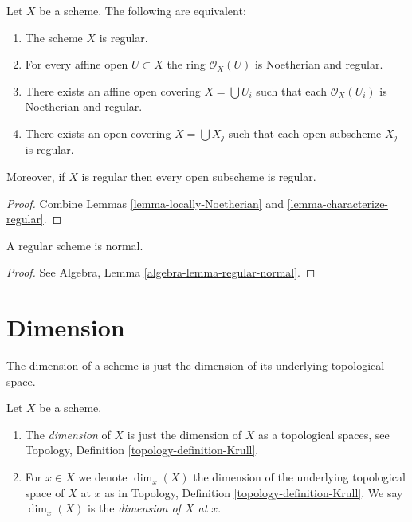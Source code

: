 \begin{lemma}
\label{lemma-locally-regular}
Let $X$ be a scheme. The following are equivalent:
\begin{enumerate}
\item The scheme $X$ is regular.
\item For every affine open $U \subset X$ the ring $\mathcal{O}_X(U)$
is Noetherian and regular.
\item There exists an affine open covering $X = \bigcup U_i$ such that
each $\mathcal{O}_X(U_i)$ is Noetherian and regular.
\item There exists an open covering $X = \bigcup X_j$
such that each open subscheme $X_j$ is regular.
\end{enumerate}
Moreover, if $X$ is regular then every open subscheme is regular.
\end{lemma}

\begin{proof}
Combine Lemmas \ref{lemma-locally-Noetherian}
and \ref{lemma-characterize-regular}.
\end{proof}

\begin{lemma}
\label{lemma-regular-normal}
A regular scheme is normal.
\end{lemma}

\begin{proof}
See
Algebra, Lemma \ref{algebra-lemma-regular-normal}.
\end{proof}




\section{Dimension}
\label{section-dimension}

\noindent
The dimension of a scheme is just the dimension of its underlying
topological space.

\begin{definition}
\label{definition-dimension}
Let $X$ be a scheme.
\begin{enumerate}
\item The {\it dimension} of $X$ is just the dimension of $X$
as a topological spaces, see
Topology, Definition \ref{topology-definition-Krull}.
\item For $x \in X$ we denote $\dim_x(X)$ the dimension of the underlying
topological space of $X$ at $x$ as in
Topology, Definition \ref{topology-definition-Krull}.
We say $\dim_x(X)$ is the {\it dimension of $X$ at $x$}.
\end{enumerate}
\end{definition}

